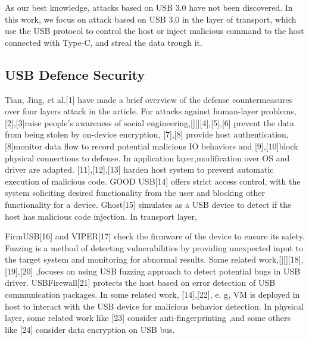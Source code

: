 As our best knowledge, attacks based on USB 3.0\cite{usb03} have not been discovered. In this work, we focus on attack based on USB 3.0 in the layer of transport\cite{sok}, which use the USB protocol to control the host or inject malicious command to the host connected with Type-C\cite{typec}, and streal the data trough it.

\subsection{USB Defence Security}

Tian, Jing, et al.[1] have made a brief overview of the defense countermeasures over four layers attack in the article. For attacks against human-layer problems, [2],[3]raise people's awareness of social engineering,[][][4],[5],[6] prevent the data from being stolen by on-device encryption, [7],[8] provide host authentication, [8]monitor data flow to record potential malicious IO behaviors and [9],[10]block physical connections to defense. In application layer,modification over OS and driver are adapted. [11],[12],[13] harden  host system to prevent automatic execution of malicious code. GOOD USB[14] offers strict access control, with the system soliciting desired functionality from the user and blocking other functionality for a device. Ghost[15] simulates as a USB device to detect if the host has malicious code injection. In transport layer, 

FirmUSB[16] and VIPER[17] check the firmware of the device to ensure its safety. Fuzzing is a method of detecting vulnerabilities by providing unexpected input to the target system and monitoring for abnormal results. Some related work,[][][18],[19],[20] ,focuses on using USB fuzzing approach to detect potential bugs in USB driver. USBFirewall[21] protects the host based on error detection of USB communication packages. In some related work, [14],[22], e. g, VM is deployed in host to interact with the USB device for malicious behavior detection. In physical layer, some related work like [23] consider anti-fingerprinting ,and some others like [24] consider data encryption on USB bus.